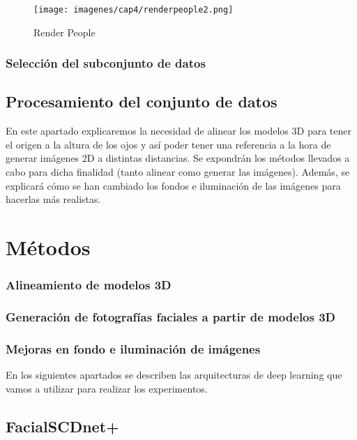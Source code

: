 \begin{figure}[h]
	\centering
	\texttt{[image: imagenes/cap4/renderpeople2.png]}
	\caption{Render People}
	\label{fig5}
\end{figure}

\subsubsection{Selección del subconjunto de datos}


\subsection{Procesamiento del conjunto de datos}
En este apartado explicaremos la necesidad de alinear los modelos 3D para tener el origen a la altura de los ojos y así poder tener una referencia a la hora de generar imágenes 2D a distintas distancias. Se expondrán los métodos llevados a cabo para dicha finalidad (tanto alinear como generar las imágenes). Además, se explicará cómo se han cambiado los fondos e iluminación de las imágenes para hacerlas más realistas.

\section{Métodos}

\subsubsection{Alineamiento de modelos 3D}

\subsubsection{Generación de fotografías faciales a partir de modelos 3D}

\subsubsection{Mejoras en fondo e iluminación de imágenes}

En los siguientes apartados se describen las arquitecturas de deep learning que vamos a utilizar para realizar los experimentos.

\subsection{FacialSCDnet+}


